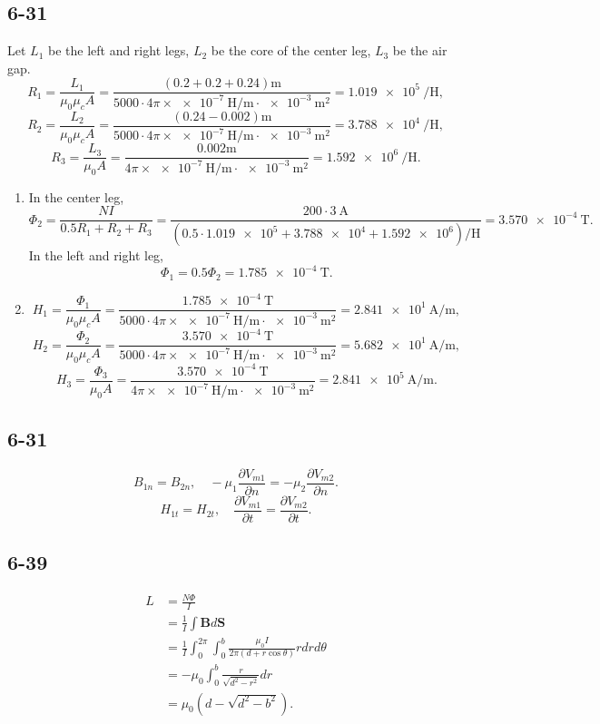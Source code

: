 \documentclass[6pt,a4paper]{article}
\begin{document}
\subsection{6-31}
Let $L_1$ be the left and right legs, $L_2$ be the core of the center leg, $L_3$ be the air gap.
$$R_1=\frac{L_1}{\mu_0\mu_cA}=\frac{(0.2+0.2+0.24)\si{\meter}}{5000\cdot4\pi\times\SI{e-7}{\henry/\meter}\cdot\SI{e-3}{\meter\squared}}=\SI{1.019e5}{\per\henry},$$
$$R_2=\frac{L_2}{\mu_0\mu_cA}=\frac{(0.24-0.002)\si{\meter}}{5000\cdot4\pi\times\SI{e-7}{\henry/\meter}\cdot\SI{e-3}{\meter\squared}}=\SI{3.788e4}{\per\henry},$$
$$R_3=\frac{L_3}{\mu_0A}=\frac{0.002\si{\meter}}{4\pi\times\SI{e-7}{\henry/\meter}\cdot\SI{e-3}{\meter\squared}}=\SI{1.592e6}{\per\henry}.$$
\begin{enumerate}[label=\alph*)]
\item
In the center leg,
$$\Phi_2=\frac{NI}{0.5R_1+R_2+R_3}=\frac{200\cdot\SI{3}{\ampere}}{(0.5\cdot\num{1.019e5}+\num{3.788e4}+\num{1.592e6})\si{\per\henry}}=\SI{3.570e-4}{\tesla}.$$
In the left and right leg,
$$\Phi_1=0.5\Phi_2=\SI{1.785e-4}{\tesla}.$$
\item
$$H_1=\frac{\Phi_1}{\mu_0\mu_cA}=\frac{\SI{1.785e-4}{\tesla}}{5000\cdot4\pi\times\SI{e-7}{\henry/\meter}\cdot\SI{e-3}{\meter\squared}}=\SI{2.841e1}{\ampere/\meter},$$
$$H_2=\frac{\Phi_2}{\mu_0\mu_cA}=\frac{\SI{3.570e-4}{\tesla}}{5000\cdot4\pi\times\SI{e-7}{\henry/\meter}\cdot\SI{e-3}{\meter\squared}}=\SI{5.682e1}{\ampere/\meter},$$
$$H_3=\frac{\Phi_3}{\mu_0A}=\frac{\SI{3.570e-4}{\tesla}}{4\pi\times\SI{e-7}{\henry/\meter}\cdot\SI{e-3}{\meter\squared}}=\SI{2.841e5}{\ampere/\meter}.$$
\end{enumerate}

\subsection{6-31}
$$B_{1n}=B_{2n},\quad -\mu_1\frac{\partial V_{m1}}{\partial n}=-\mu_2\frac{\partial V_{m2}}{\partial n}.$$
$$H_{1t}=H_{2t},\quad \frac{\partial V_{m1}}{\partial t}=\frac{\partial V_{m2}}{\partial t}.$$

\subsection{6-39}
\begin{align*}
L&=\frac{N\Phi}{I}\\&=\frac{1}{I}\int\mathbf{B}d\mathbf{S}\\&=\frac{1}{I}\int_0^{2\pi}\int_0^b\frac{\mu_0I}{2\pi(d+r\cos\theta)}rdrd\theta\\&=-\mu_0\int_0^b\frac{r}{\sqrt{d^2-r^2}}dr\\&=\mu_0(d-\sqrt{d^2-b^2}).
\end{align*}
\end{document}
